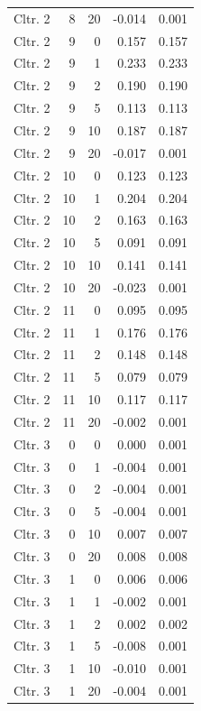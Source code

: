 \begin{longtable}{lrrrr}
  Cltr. 2 &    8 &   20 & -0.014 & 0.001 \\ 
  Cltr. 2 &    9 &    0 & 0.157 & 0.157 \\ 
  Cltr. 2 &    9 &    1 & 0.233 & 0.233 \\ 
  Cltr. 2 &    9 &    2 & 0.190 & 0.190 \\ 
  Cltr. 2 &    9 &    5 & 0.113 & 0.113 \\ 
  Cltr. 2 &    9 &   10 & 0.187 & 0.187 \\ 
  Cltr. 2 &    9 &   20 & -0.017 & 0.001 \\ 
  Cltr. 2 &   10 &    0 & 0.123 & 0.123 \\ 
  Cltr. 2 &   10 &    1 & 0.204 & 0.204 \\ 
  Cltr. 2 &   10 &    2 & 0.163 & 0.163 \\ 
  Cltr. 2 &   10 &    5 & 0.091 & 0.091 \\ 
  Cltr. 2 &   10 &   10 & 0.141 & 0.141 \\ 
  Cltr. 2 &   10 &   20 & -0.023 & 0.001 \\ 
  Cltr. 2 &   11 &    0 & 0.095 & 0.095 \\ 
  Cltr. 2 &   11 &    1 & 0.176 & 0.176 \\ 
  Cltr. 2 &   11 &    2 & 0.148 & 0.148 \\ 
  Cltr. 2 &   11 &    5 & 0.079 & 0.079 \\ 
  Cltr. 2 &   11 &   10 & 0.117 & 0.117 \\ 
  Cltr. 2 &   11 &   20 & -0.002 & 0.001 \\ 
  Cltr. 3 &    0 &    0 & 0.000 & 0.001 \\ 
  Cltr. 3 &    0 &    1 & -0.004 & 0.001 \\ 
  Cltr. 3 &    0 &    2 & -0.004 & 0.001 \\ 
  Cltr. 3 &    0 &    5 & -0.004 & 0.001 \\ 
  Cltr. 3 &    0 &   10 & 0.007 & 0.007 \\ 
  Cltr. 3 &    0 &   20 & 0.008 & 0.008 \\ 
  Cltr. 3 &    1 &    0 & 0.006 & 0.006 \\ 
  Cltr. 3 &    1 &    1 & -0.002 & 0.001 \\ 
  Cltr. 3 &    1 &    2 & 0.002 & 0.002 \\ 
  Cltr. 3 &    1 &    5 & -0.008 & 0.001 \\ 
  Cltr. 3 &    1 &   10 & -0.010 & 0.001 \\ 
  Cltr. 3 &    1 &   20 & -0.004 & 0.001 \\ 

\end{longtable}
